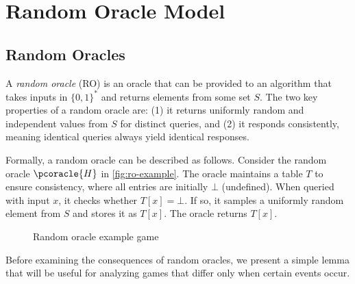 \section{Random Oracle Model}\label{sec:rom}

\subsection{Random Oracles}

A \emph{random oracle} (RO) is an oracle that can be provided to an algorithm that takes inputs in $\{0, 1\}^*$ and returns elements from some set $S$.
The two key properties of a random oracle are: (1) it returns uniformly random and independent values from $S$ for distinct queries, and (2) it responds consistently, meaning identical queries always yield identical responses.

Formally, a random oracle can be described as follows.
Consider the random oracle $\pcoracle{H}$ in \autoref{fig:ro-example}.
The oracle maintains a table $T$ to ensure consistency, where all entries are initially $\bot$ (undefined).
When queried with input $x$, it checks whether $T[x] = \bot$. If so, it samples a uniformly random element from $S$ and stores it as $T[x]$.
The oracle returns $T[x]$.


\begin{figure}[tbhp]
  \begin{center}
    \begin{tcolorbox}[width=8cm]
      \begin{pchstack}
        \pchspace
      \end{pchstack}
    \end{tcolorbox}
  \end{center}
  \caption{Random oracle example game\label{fig:ro-example}}
\end{figure}

Before examining the consequences of random oracles, we present a simple lemma that will be useful for analyzing games that differ only when certain events occur.

